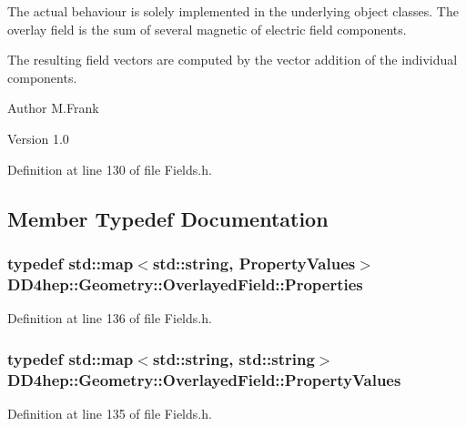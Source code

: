The actual behaviour is solely implemented in the underlying object classes. The overlay field is the sum of several magnetic of electric field components.

The resulting field vectors are computed by the vector addition of the individual components.

\begin{DoxyAuthor}{Author}
M.Frank 
\end{DoxyAuthor}
\begin{DoxyVersion}{Version}
1.0 
\end{DoxyVersion}


Definition at line 130 of file Fields.h.

\subsection{Member Typedef Documentation}
\hypertarget{class_d_d4hep_1_1_geometry_1_1_overlayed_field_acdf81fbf8e0c336cb724ee2846a2c5b0}{
\subsubsection[{Properties}]{\setlength{\rightskip}{0pt plus 5cm}typedef std::map$<$std::string, {\bf PropertyValues}$>$ {\bf DD4hep::Geometry::OverlayedField::Properties}}}
\label{class_d_d4hep_1_1_geometry_1_1_overlayed_field_acdf81fbf8e0c336cb724ee2846a2c5b0}


Definition at line 136 of file Fields.h.\hypertarget{class_d_d4hep_1_1_geometry_1_1_overlayed_field_ade93bff8af042a76d9d25e1f7072b532}{
\subsubsection[{PropertyValues}]{\setlength{\rightskip}{0pt plus 5cm}typedef std::map$<$std::string, std::string$>$ {\bf DD4hep::Geometry::OverlayedField::PropertyValues}}}
\label{class_d_d4hep_1_1_geometry_1_1_overlayed_field_ade93bff8af042a76d9d25e1f7072b532}


Definition at line 135 of file Fields.h.

